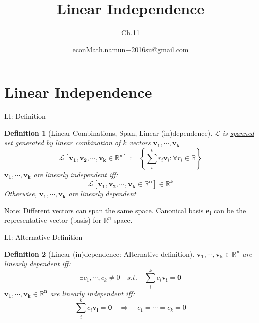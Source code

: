 \documentclass[a4paper,11pt]{article}
\author[조남운]{\url{econMath.namun+2016su@gmail.com}}
\title{Linear Independence}
\subtitle{Ch.11}
\newtheorem{defn}{Definition}
\begin{document}
	
\maketitle


\section{Linear Independence} %
\label{sec:linear_independence}
\begin{frame}[t]{LI: Definition}
	\begin{defn}
		[Linear Combinations, Span, Linear (in)dependence]
		$\mathcal{L}$ is \uline{spanned} set generated by \uline{linear combination} of $k$ vectors $\mathbf{v_1,\cdots,v_k}$
		\[
			\mathcal{L}[\mathbf{v_1,v_2,\cdots,v_k\in\mathbb{R}^n}]:=\left\{\sum_i^k r_i \mathbf{v}_i: \forall r_i\in \mathbb{R} \right\}
		\]
		$\mathbf{v_1,\cdots,v_k}$ are \uline{linearly independent} iff:
		\[
			\mathcal{L}[\mathbf{v_1,v_2,\cdots,v_k\in\mathbb{R}^n}]\in \mathbb{R}^k
		\]
		Otherwise, $\mathbf{v_1,\cdots,v_k}$ are \uline{linearly dependent}
	\end{defn}
	Note: Different vectors can span the same space. Canonical basis $\mathbf{e_i}$ can be the representative vector (basis) for $\mathbb{R}^n$ space.
\end{frame}

\begin{frame}[t]{LI: Alternative Definition}
	\begin{defn}
		[Linear (in)dependence: Alternative definition]
		$\mathbf{v_1,\cdots,v_k\in\mathbb{R}^n}$ are \uline{linearly dependent} iff:
		\[
			\exists c_1,\cdots,c_k \neq 0 \quad s.t.\quad \sum_i^k c_i\mathbf{v_i} = \mathbf{0}
		\]
		$\mathbf{v_1,\cdots,v_k\in\mathbb{R}^n}$ are \uline{linearly independent} iff:
		\[
			\sum_i^k c_i\mathbf{v_i} = \mathbf{0} \quad\Rightarrow\quad c_1 = \cdots = c_k = 0
		\]
	\end{defn}
\end{frame}
\end{document}
